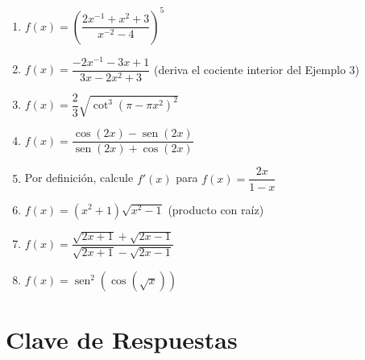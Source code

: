 \documentclass[12pt, letterpaper]{article}
\begin{document}
\begin{enumerate}[leftmargin=*]
  \item \muyDificil{} $f(x) = \left(\dfrac{2x^{-1} + x^2 + 3}{x^{-2} - 4}\right)^{5}$ %

  \item \muyDificil{} $f(x) = \dfrac{-2x^{-1} - 3x + 1}{3x - 2x^2 + 3}$ (deriva el cociente interior del Ejemplo 3) %

  \item \muyDificil{} $f(x) = \dfrac{2}{3}\sqrt{\cot^3(\pi - \pi x^2)^2}$ %

  \item \muyDificil{} $f(x) = \dfrac{\cos(2x) - \operatorname{sen}(2x)}{\operatorname{sen}(2x) + \cos(2x)}$ %

  \item \muyDificil{} Por definición, calcule $f'(x)$ para $f(x) = \dfrac{2x}{1-x}$ %

  \item \muyDificil{} $f(x) = (x^2 + 1)\sqrt{x^2 - 1}$ (producto con raíz)

  \item \muyDificil{} $f(x) = \dfrac{\sqrt{2x + 1} + \sqrt{2x - 1}}{\sqrt{2x + 1} - \sqrt{2x - 1}}$

  \item \muyDificil{} $f(x) = \operatorname{sen}^2\!\left(\cos\!\left(\sqrt{x}\right)\right)$

\end{enumerate}

\newpage
\ifmwclaves
  \section{Clave de Respuestas}
\end{document}
